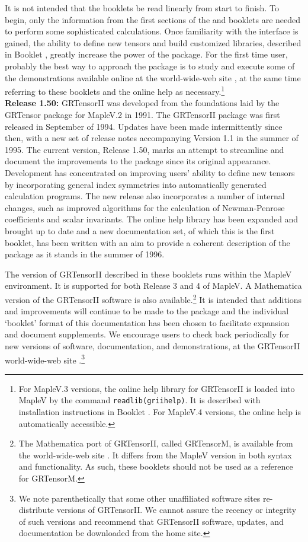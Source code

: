 \documentclass{article}
\begin{document}
It is not intended that the booklets be read linearly from start to
finish. To begin, only the information from the first sections of the
\textsl{\grMakegTitle} and \textsl{\grCalcTitle} booklets are needed
to perform some sophisticated calculations. Once familiarity with the
interface is gained, the ability to define new tensors and build
customized libraries, described in Booklet \grDefRef, greatly increase
the power of the package.  For the first time user, probably the best
way to approach the package is to study and execute some of the
demonstrations available online at the world-wide-web site \cite{www},
at the same time referring to these booklets and the online help as
necessary.\footnote{For MapleV.3 versions, the online help library for
GRTensorII is loaded into MapleV by the command
\texttt{readlib(griihelp)}. It is described with installation
instructions in Booklet \grSetupRef. For MapleV.4 versions, the online
help is automatically accessible.}\\

\textbf{Release 1.50:} GRTensorII was developed from the foundations
laid by the GRTensor package for MapleV.2 in 1991. The GRTensorII
package was first released in September of 1994. Updates have been
made intermittently since then, with a new set of release notes
accompanying Version 1.1 in the summer of 1995. The current version,
Release 1.50, marks an attempt to streamline and document the
improvements to the package since its original appearance. Development
has concentrated on improving users' ability to define new tensors by
incorporating general index symmetries into automatically generated
calculation programs. The new release also incorporates a number of
internal changes, such as improved algorithms for the calculation of
Newman-Penrose coefficients and scalar invariants. The online help
library has been expanded and brought up to date and a new documentation
set, of which this is the first booklet, has been written with an aim
to provide a coherent description of the package as it stands in the
summer of 1996.

The version of GRTensorII described in these booklets runs within the
MapleV environment.  It is supported for both Release 3 and 4 of
MapleV. A Mathematica version of the GRTensorII software is also
available.\footnote{The Mathematica port of GRTensorII, called
GRTensorM, is available from the world-wide-web site \cite{www}. It
differs from the MapleV version in both syntax and functionality. As
such, these booklets should not be used as a reference for GRTensorM.}
It is intended that additions and improvements will continue to be
made to the package  and the individual `booklet' format of this
documentation has been chosen to facilitate expansion and document
supplements.  We encourage users to check back periodically for new
versions of software, documentation, and demonstrations, at the
GRTensorII world-wide-web site \cite{www}.\footnote{We note
parenthetically that some other unaffiliated software sites
re-distribute versions of GRTensorII.  We cannot assure the recency or
integrity of such versions and recommend that GRTensorII software,
updates, and documentation be downloaded from the home site.}
%
\end{document}
